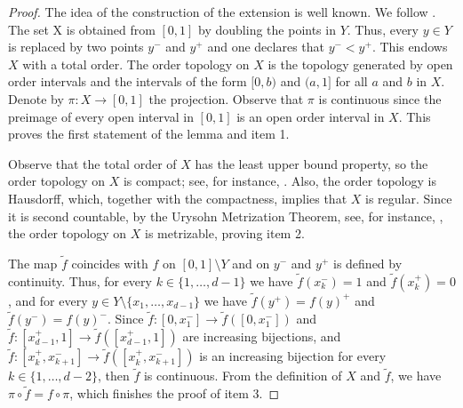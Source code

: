 \documentclass[12pt]{amsart}
\numberwithin{equation}{section} %
\numberwithin{figure}{section} %
\theoremstyle{plain}
\theoremstyle{definition}
\theoremstyle{remark}
\theoremstyle{citing}
\renewcommand{\=}{\coloneqq}
\begin{document}
\begin{proof}
    The idea of the construction of the extension is well known. We follow \cite[Appendix A.5]{Keller2}. The set X is obtained from $[0,1]$ by doubling the points in $Y$. Thus, every $y\in Y$ is replaced by two points $y^-$ and $y^+$ and one declares that $y^-<y^+$. This endows $X$ with a total order. The order topology on $X$ is the topology generated by open order intervals and the intervals of the form $[0,b)$ and $(a,1]$ for all $a$ and $b$ in $X$. Denote by $\pi: X\to[0,1]$ the projection. Observe that $\pi$ is continuous since the preimage of every open interval in $[0,1]$ is an open order interval in $X$. This proves the first statement of the lemma and item 1.

    Observe that the total order of $X$ has the least upper bound property, so the order topology on $X$ is compact; see, for instance, \cite[Theorem 27.1]{munkres}. Also, the order topology is Hausdorff, which, together with the compactness, implies that $X$ is regular. Since it is second countable, by the Urysohn Metrization Theorem, see, for instance, \cite[Theorem 34.1]{munkres}, the order topology on $X$ is metrizable, proving item 2.

    The map $\widetilde{f}$ coincides with $f$ on $[0,1]\setminus Y$ and on $y^-$ and $y^+$ is defined by continuity. Thus, for every $k\in \{1,\ldots,d-1\}$ we have $\widetilde{f}(x_k^-)=1$ and $\widetilde{f}(x_k^+)=0$, and for every $y\in Y\setminus \{x_1,\ldots,x_{d-1}\}$ we have $\widetilde{f}(y^+) = f(y)^+$ and $\widetilde{f}(y^-)=f(y)^-$. Since $\widetilde{f}: [0,x_1^-]\to \widetilde{f}([0,x_1^-])$ and $\widetilde{f}: [x_{d-1}^+,1]\to \widetilde{f}([x_{d-1}^+,1])$ are increasing bijections, and $\widetilde{f}: [x_k^+,x_{k+1}^-]\to \widetilde{f}([x_k^+,x_{k+1}^-])$ is an increasing bijection for every $k\in\{1,\ldots, d-2\}$, then $\widetilde{f}$ is continuous. From the definition of $X$ and $\widetilde{f}$, we have $\pi\circ\widetilde{f}= f\circ\pi$, which finishes the proof of item 3.


\end{proof}
\end{document}
